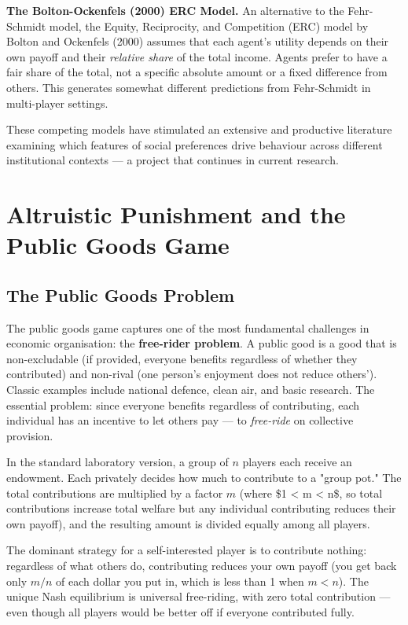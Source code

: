 \documentclass[12pt, letterpaper]{article}
\begin{document}
\textbf{The Bolton-Ockenfels (2000) ERC Model.} An alternative to the Fehr-Schmidt model, the Equity, Reciprocity, and Competition (ERC) model by Bolton and Ockenfels (2000) assumes that each agent's utility depends on their own payoff and their \textit{relative share} of the total income. Agents prefer to have a fair share of the total, not a specific absolute amount or a fixed difference from others. This generates somewhat different predictions from Fehr-Schmidt in multi-player settings.

These competing models have stimulated an extensive and productive literature examining which features of social preferences drive behaviour across different institutional contexts --- a project that continues in current research.

\newpage


\section{Altruistic Punishment and the Public Goods Game}



\subsection{The Public Goods Problem}


The public goods game captures one of the most fundamental challenges in economic organisation: the \textbf{free-rider problem}. A public good is a good that is non-excludable (if provided, everyone benefits regardless of whether they contributed) and non-rival (one person's enjoyment does not reduce others'). Classic examples include national defence, clean air, and basic research. The essential problem: since everyone benefits regardless of contributing, each individual has an incentive to let others pay --- to \textit{free-ride} on collective provision.

In the standard laboratory version, a group of $n$ players each receive an endowment. Each privately decides how much to contribute to a "group pot." The total contributions are multiplied by a factor $m$ (where \$1 < m < n\$, so total contributions increase total welfare but any individual contributing reduces their own payoff), and the resulting amount is divided equally among all players.

The dominant strategy for a self-interested player is to contribute nothing: regardless of what others do, contributing reduces your own payoff (you get back only $m/n$ of each dollar you put in, which is less than 1 when $m < n$). The unique Nash equilibrium is universal free-riding, with zero total contribution --- even though all players would be better off if everyone contributed fully.
\end{document}
